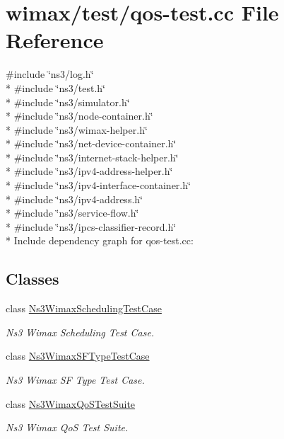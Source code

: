 \hypertarget{qos-test_8cc}{}\section{wimax/test/qos-\/test.cc File Reference}
\label{qos-test_8cc}
{\ttfamily \#include \char`\"{}ns3/log.\+h\char`\"{}}\\*
{\ttfamily \#include \char`\"{}ns3/test.\+h\char`\"{}}\\*
{\ttfamily \#include \char`\"{}ns3/simulator.\+h\char`\"{}}\\*
{\ttfamily \#include \char`\"{}ns3/node-\/container.\+h\char`\"{}}\\*
{\ttfamily \#include \char`\"{}ns3/wimax-\/helper.\+h\char`\"{}}\\*
{\ttfamily \#include \char`\"{}ns3/net-\/device-\/container.\+h\char`\"{}}\\*
{\ttfamily \#include \char`\"{}ns3/internet-\/stack-\/helper.\+h\char`\"{}}\\*
{\ttfamily \#include \char`\"{}ns3/ipv4-\/address-\/helper.\+h\char`\"{}}\\*
{\ttfamily \#include \char`\"{}ns3/ipv4-\/interface-\/container.\+h\char`\"{}}\\*
{\ttfamily \#include \char`\"{}ns3/ipv4-\/address.\+h\char`\"{}}\\*
{\ttfamily \#include \char`\"{}ns3/service-\/flow.\+h\char`\"{}}\\*
{\ttfamily \#include \char`\"{}ns3/ipcs-\/classifier-\/record.\+h\char`\"{}}\\*
Include dependency graph for qos-\/test.cc\+:
\subsection*{Classes}
\begin{DoxyCompactItemize}
\item 
class \hyperlink{classNs3WimaxSchedulingTestCase}{Ns3\+Wimax\+Scheduling\+Test\+Case}
\begin{DoxyCompactList}\small\item\em Ns3 Wimax Scheduling Test Case. \end{DoxyCompactList}\item 
class \hyperlink{classNs3WimaxSFTypeTestCase}{Ns3\+Wimax\+S\+F\+Type\+Test\+Case}
\begin{DoxyCompactList}\small\item\em Ns3 Wimax SF Type Test Case. \end{DoxyCompactList}\item 
class \hyperlink{classNs3WimaxQoSTestSuite}{Ns3\+Wimax\+Qo\+S\+Test\+Suite}
\begin{DoxyCompactList}\small\item\em Ns3 Wimax QoS Test Suite. \end{DoxyCompactList}\end{DoxyCompactItemize}
